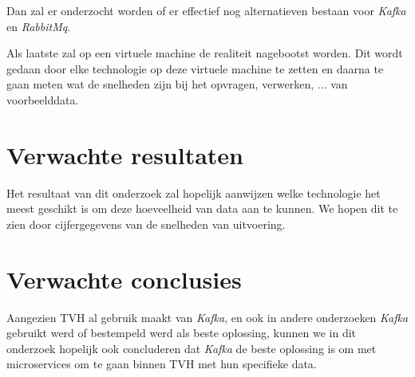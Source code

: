 Dan zal er onderzocht worden of er effectief nog alternatieven bestaan voor \emph{Kafka} en \emph{RabbitMq}.

Als laatste zal op een virtuele machine de realiteit nagebootst worden. Dit wordt gedaan door elke technologie op deze virtuele machine te zetten en daarna te gaan meten wat de snelheden zijn bij het opvragen, verwerken, ... van voorbeelddata.

\section{Verwachte resultaten}
\label{sec:verwachte_resultaten}
Het resultaat van dit onderzoek zal hopelijk aanwijzen welke technologie het meest geschikt is om deze hoeveelheid van data aan te kunnen. We hopen dit te zien door cijfergegevens van de snelheden van uitvoering. 


\section{Verwachte conclusies}
\label{sec:verwachte_conclusies}

Aangezien TVH al gebruik maakt van \emph{Kafka}, en ook in andere onderzoeken \emph{Kafka} gebruikt werd of bestempeld werd als beste oplossing, kunnen we in dit onderzoek hopelijk ook concluderen dat \emph{Kafka} de beste oplossing is om met microservices om te gaan binnen TVH met hun specifieke data.


